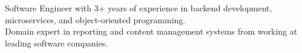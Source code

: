 \begin{rSection}{}
    \begin{center}
        Software Engineer with 3+ years of experience in backend development, microservices, and object-oriented programming. \\
        Domain expert in reporting and content management systems from working at leading software companies. \\
    \end{center}
\end{rSection}